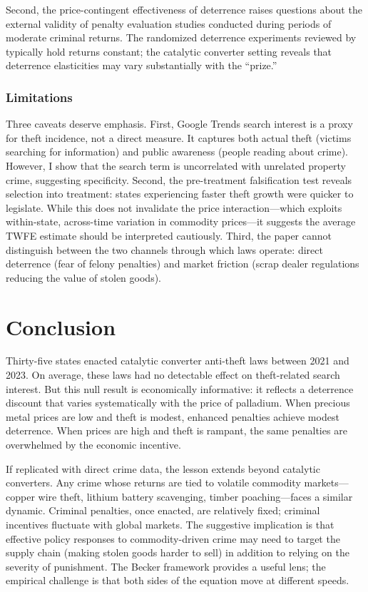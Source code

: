 \documentclass[12pt]{article}
\begin{document}
Second, the price-contingent effectiveness of deterrence raises questions about the external validity of penalty evaluation studies conducted during periods of moderate criminal returns. The randomized deterrence experiments reviewed by \citet{chalfin2018criminal} typically hold returns constant; the catalytic converter setting reveals that deterrence elasticities may vary substantially with the ``prize.''

\subsubsection*{Limitations} Three caveats deserve emphasis. First, Google Trends search interest is a proxy for theft incidence, not a direct measure. It captures both actual theft (victims searching for information) and public awareness (people reading about crime). However, I show that the search term is uncorrelated with unrelated property crime, suggesting specificity. Second, the pre-treatment falsification test reveals selection into treatment: states experiencing faster theft growth were quicker to legislate. While this does not invalidate the price interaction---which exploits within-state, across-time variation in commodity prices---it suggests the average TWFE estimate should be interpreted cautiously. Third, the paper cannot distinguish between the two channels through which laws operate: direct deterrence (fear of felony penalties) and market friction (scrap dealer regulations reducing the value of stolen goods).

\section{Conclusion}

Thirty-five states enacted catalytic converter anti-theft laws between 2021 and 2023. On average, these laws had no detectable effect on theft-related search interest. But this null result is economically informative: it reflects a deterrence discount that varies systematically with the price of palladium. When precious metal prices are low and theft is modest, enhanced penalties achieve modest deterrence. When prices are high and theft is rampant, the same penalties are overwhelmed by the economic incentive.

If replicated with direct crime data, the lesson extends beyond catalytic converters. Any crime whose returns are tied to volatile commodity markets---copper wire theft, lithium battery scavenging, timber poaching---faces a similar dynamic. Criminal penalties, once enacted, are relatively fixed; criminal incentives fluctuate with global markets. The suggestive implication is that effective policy responses to commodity-driven crime may need to target the supply chain (making stolen goods harder to sell) in addition to relying on the severity of punishment. The Becker framework provides a useful lens; the empirical challenge is that both sides of the equation move at different speeds.
\end{document}
